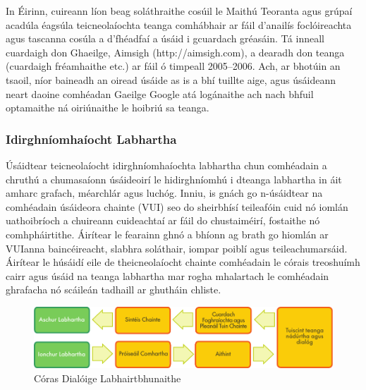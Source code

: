 \begin{multicols}{2}
 In Éirinn, cuireann líon beag soláthraithe cosúil le Maithú Teoranta agus grúpaí acadúla éagsúla teicneolaíochta teanga comhábhair ar fáil d’anailís foclóireachta agus tascanna cosúla a d’fhéadfaí a úsáid i gcuardach gréasáin. Tá inneall cuardaigh don Ghaeilge, Aimsigh (http://aimsigh.com), a dearadh don teanga (cuardaigh fréamhaithe etc.) ar fáil ó timpeall 2005--2006. Ach, ar bhotúin an tsaoil, níor baineadh an oiread úsáide as is a bhí tuillte aige, agus úsáideann neart daoine comhéadan Gaeilge Google atá logánaithe ach nach bhfuil optamaithe ná oiriúnaithe le hoibriú sa teanga.
  
\subsubsection{Idirghníomhaíocht Labhartha}

Úsáidtear teicneolaíocht idirghníomhaíochta labhartha chun comhéadain a chruthú a chumasaíonn úsáideoirí le hidirghníomhú i dteanga labhartha in áit amharc grafach, méarchlár agus luchóg. Inniu, is gnách go n-úsáidtear na comhéadain úsáideora chainte (VUI) seo do sheirbhísí teileafóin cuid nó iomlán uathoibríoch a chuireann cuideachtaí ar fáil do chustaiméirí, fostaithe nó comhpháirtithe. Áirítear le fearainn ghnó a bhíonn ag brath go hiomlán ar VUIanna baincéireacht, slabhra soláthair, iompar poiblí agus teileachumarsáid. Áirítear le húsáidí eile de theicneolaíocht chainte comhéadain le córais treoshuímh cairr agus úsáid na teanga labhartha mar rogha mhalartach le comhéadain ghrafacha nó scáileán tadhaill ar ghutháin chliste.


\begin{figure}[htb]
  \center 
  \includegraphics[width=\textwidth]{../_media/irish/simple_speech-based_dialogue_architecture}
  \caption{Córas Dialóige Labhairtbhunaithe}
  \label{fig:dialoguearch_de}
\end{figure}


\end{multicols}
